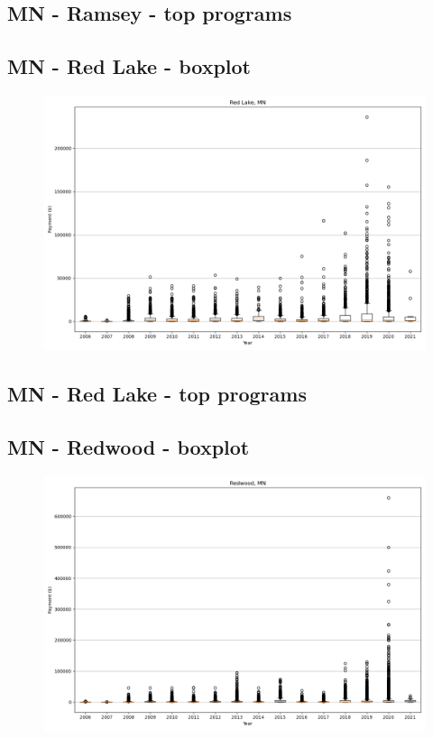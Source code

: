 \subsection*{MN - Ramsey - top programs}

\newpage
\subsection*{MN - Red Lake - boxplot}
\begin{figure}[h]
\centering
\includegraphics[width=7in]{../output/boxplots/counties/Red Lake-MN_boxplot.png}
\end{figure}


\subsection*{MN - Red Lake - top programs}

\newpage
\subsection*{MN - Redwood - boxplot}
\begin{figure}[h]
\centering
\includegraphics[width=7in]{../output/boxplots/counties/Redwood-MN_boxplot.png}
\end{figure}


